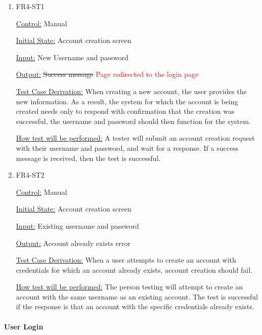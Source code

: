\documentclass[12pt, titlepage]{article}
\begin{document}
\begin{enumerate}

\item{FR4-ST1\\}

\underline{Control:} Manual

\underline{Initial State:} Account creation screen

\underline{Input:} New Username and password

\underline{Output:} \sout{Success message} \textcolor{red} {Page redirected to the login page}

\underline{Test Case Derivation:} When creating a new account, the user provides the new information. As a result, the system for which the account is being created needs only to respond with confirmation that the creation was successful, the username and password should then function for the system.

\underline{How test will be performed:} A tester will submit an account creation request with their username and password, and wait for a response. If a success message is received, then the test is successful.
					
\item{FR4-ST2\\}

\underline{Control:} Manual

\underline{Initial State:} Account creation screen

\underline{Input:} Existing username and password

\underline{Output:} Account already exists error

\underline{Test Case Derivation:} When a user attempts to create an account with credentials for which an account already exists, account creation should fail. 

\underline{How test will be performed:} The person testing will attempt to create an account with the same username as an existing account. The test is successful if the response is that an account with the specific credentials already exists.

\end{enumerate}

\paragraph{User Login}
\end{document}
